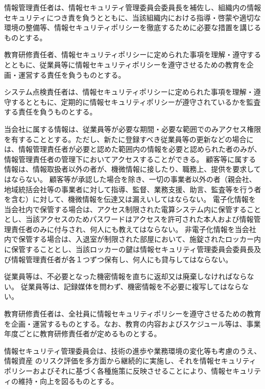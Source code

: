 \documentclass[10pt,a4paper,uplatex]{jsarticle}
\begin{document}
情報管理責任者は、情報セキュリティ管理委員会委員長を補佐し、組織内の情報セキュリティにつき責を負うとともに、当該組織内における指導・啓蒙や適切な環境の整備等、情報セキュリティポリシーを徹底するために必要な措置を講じるものとする。

教育研修責任者、情報セキュリティポリシーに定められた事項を理解・遵守するとともに、従業員等に情報セキュリティポリシーを遵守させるための教育を企画・運営する責任を負うものとする。

システム点検責任者は、情報セキュリティポリシーに定められた事項を理解・遵守するとともに、定期的に情報セキュリティポリシーが遵守されているかを監査する責任を負うものとする。

当会社に属する情報は、従業員等が必要な期間・必要な範囲でのみアクセス権限を有することとする。ただし、新たに登録すべき従業員等の更新などの場合には、情報管理責任者が必要と認めた範囲内の情報を必要と認められた者のみが、情報管理責任者の管理下においてアクセスすることができる。
\term 顧客等に属する情報は、情報取扱者以外の者が、機微情報に接したり、職務上、提供を要求してはならない。
\term 顧客等が承認した場合を除き、一切の事業者以外の者（親会社、地域統括会社等の事業者に対して指導、監督、業務支援、助言、監査等を行う者を含む）に対して、機微情報を伝達又は漏えいしてはならない。
\term 電子化情報を当会社内で保管する場合は、アクセス制限された電算システム内に保管することとし、当該アクセスのためパスワードはアクセスを許可された本人および情報管理責任者のみに付与され、何人にも教えてはならない。
\term 非電子化情報を当会社内で保管する場合は、入退室が制限された部屋において、施錠されたロッカー内に保管することとし、当該ロッカーの鍵は情報セキュリティ管理委員会委員長及び情報管理責任者が各１つずつ保有し、何人にも貸与してはならない。

従業員等は、不必要となった機密情報を直ちに返却又は廃棄しなければならない。
\term 従業員等は、記録媒体を問わず、機密情報を不必要に複写してはならない。

教育研修責任者は、全社員に情報セキュリティポリシーを遵守させるための教育を企画・運営するものとする。なお、教育の内容およびスケジュール等は、事業年度ごとに教育研修責任者が定めるものとする。

情報セキュリティ管理委員会は、技術の進歩や業務環境の変化等も考慮のうえ、情報資産
のリスク評価を多方面から継続的に実施し、それを情報セキュリティポリシーおよびそれに基づく各種施策に反映させることにより、情報セキュリティの維持・向上を図るものとする。
\end{document}
